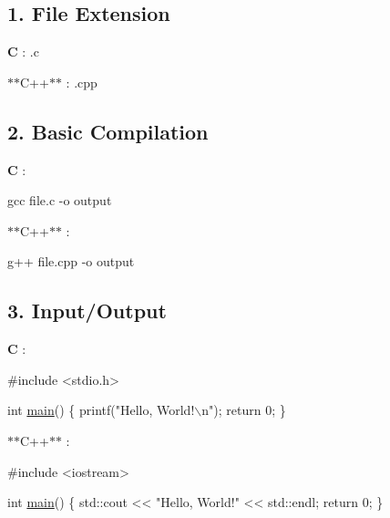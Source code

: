 \subsection*{1. File Extension}


\begin{DoxyItemize}
\item {\bfseries C} \+: {\ttfamily .c}
\item $\ast$$\ast$\+C++$\ast$$\ast$ \+: {\ttfamily .cpp}
\end{DoxyItemize}

\subsection*{2. Basic Compilation}


\begin{DoxyItemize}
\item {\bfseries C} \+: 
\begin{DoxyCode}
gcc file.c -o output
\end{DoxyCode}

\item $\ast$$\ast$\+C++$\ast$$\ast$ \+: 
\begin{DoxyCode}
g++ file.cpp -o output
\end{DoxyCode}

\end{DoxyItemize}

\subsection*{3. Input/\+Output}


\begin{DoxyItemize}
\item {\bfseries C} \+: 
\begin{DoxyCode}
\textcolor{preprocessor}{#include <stdio.h>}

\textcolor{keywordtype}{int} \hyperlink{htop_8c_a3c04138a5bfe5d72780bb7e82a18e627}{main}() \{
    printf(\textcolor{stringliteral}{"Hello, World!\(\backslash\)n"});
    \textcolor{keywordflow}{return} 0;
\}
\end{DoxyCode}

\item $\ast$$\ast$\+C++$\ast$$\ast$ \+: 
\begin{DoxyCode}
\textcolor{preprocessor}{#include <iostream>}

\textcolor{keywordtype}{int} \hyperlink{htop_8c_a3c04138a5bfe5d72780bb7e82a18e627}{main}() \{
    std::cout << \textcolor{stringliteral}{"Hello, World!"} << std::endl;
    \textcolor{keywordflow}{return} 0;
\}
\end{DoxyCode}

\end{DoxyItemize}

